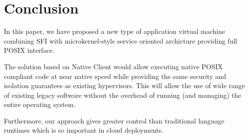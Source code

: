 \section{Conclusion}
\label{sec:conclusion}

In this paper, we have proposed a new type of application virtual
machine combining SFI with microkernel-style service oriented
archicture providing full POSIX interface.

The solution based on Native Client would allow executing native POSIX
compliant code at near native speed while providing the same security
and isolation guarantees as existing hypervisors. This will allow
the use of wide range of existing legacy software without the overhead
of running (and managing) the entire operating system.

Furthermore, our approach gives greater control than traditional
language runtimes which is so important in cloud deployments.
